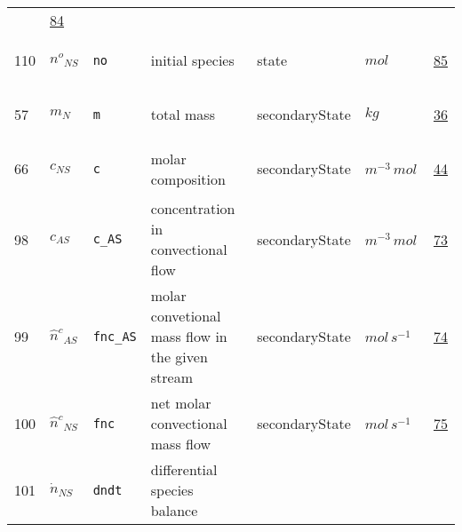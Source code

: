 \begin{longtable}{|p{1cm}|p{2.5cm}|p{4.5cm}|p{8cm}|p{3.0cm}|p{3cm}|p{1cm}|}
             & \hyperlink{"e:84"}{ 84 }
                 \\
    110
             & \hypertarget{"v:110"}{ $ {{n^o}}{_{{N S}}} $}
             & \verb|no|
             & initial species
             & \begin{lay}state \end{lay}
             & $ mol \, $
             & \hyperlink{"e:85"}{ 85 }
                 \\
    57
             & \hypertarget{"v:57"}{ $ {m}{_{N}} $}
             & \verb|m|
             & total mass
             & \begin{lay}secondaryState \end{lay}
             & $ kg \, $
             & \hyperlink{"e:36"}{ 36 }
                 \\
    66
             & \hypertarget{"v:66"}{ $ {c}{_{{N S}}} $}
             & \verb|c|
             & molar composition
             & \begin{lay}secondaryState \end{lay}
             & $ m^{-3} \,mol \, $
             & \hyperlink{"e:44"}{ 44 }
                 \\
    98
             & \hypertarget{"v:98"}{ $ {c}{_{{A S}}} $}
             & \verb|c_AS|
             & concentration in convectional flow
             & \begin{lay}secondaryState \end{lay}
             & $ m^{-3} \,mol \, $
             & \hyperlink{"e:73"}{ 73 }
                 \\
    99
             & \hypertarget{"v:99"}{ $ {{\hat{n}^c}}{_{{A S}}} $}
             & \verb|fnc_AS|
             & molar convetional mass flow in the given stream
             & \begin{lay}secondaryState \end{lay}
             & $ mol \,s^{-1} \, $
             & \hyperlink{"e:74"}{ 74 }
                 \\
    100
             & \hypertarget{"v:100"}{ $ {{\hat{n}^c}}{_{{N S}}} $}
             & \verb|fnc|
             & net molar convectional mass flow
             & \begin{lay}secondaryState \end{lay}
             & $ mol \,s^{-1} \, $
             & \hyperlink{"e:75"}{ 75 }
                 \\
    101
             & \hypertarget{"v:101"}{ $ {\dot{n}}{_{{N S}}} $}
             & \verb|dndt|
             & differential species balance

\end{longtable}
